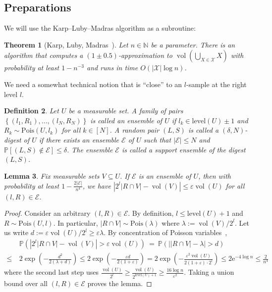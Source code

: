 \documentclass[11pt]{article}
\def\Natural{\mathbb{N}}
\let\N\Natural
\def\vol{\operatorname{vol}}		%
\def\set#1{\left\{ #1 \right\}}
\def\card#1{\left\lvert #1 \right\rvert}		%
\newtheorem{theorem}{Theorem}[section]
\newtheorem{lemma}[theorem]{Lemma}
\newtheorem{definition}[theorem]{Definition}
\newcommand{\Pois}{\mathrm{Pois}}
\newcommand{\level}{\mathrm{level}}
\newcommand{\eps}{\varepsilon}
\renewcommand{\Pr}{\mathbb{P}}
\newcommand{\class}[1]{\mathcal{#1}}
\begin{document}
\subsection{Preparations}
%
We will use the Karp--Luby--Madras algorithm as a subroutine:
%
\begin{theorem}[Karp, Luby, Madras~\cite{KarpLM89}]
    \label{thm:KLM}
    Let $n \in \N$ be a parameter. There is an algorithm \KLM{$\class{X}$} that computes a $(1\pm 0.5)$-approximation to $\vol(\bigcup_{X \in \class{X}} X)$ with probability at least $1 - n^{-3}$ and runs in time $O(|\class{X}| \log n)$.
\end{theorem}
%
\noindent
We need a somewhat technical notion that is ``close'' to an $l$-sample at the right level $l$.
\begin{definition}
    \label{def:digest}
    Let $U$ be a measurable set. A family of pairs $\set{(l_1,R_1), \dots, (l_N, R_N)}$ is called an \emph{ensemble} of $U$ if $l_k \in \level(U) \pm 1$ and $R_k \sim \Pois(U,l_k)$ for all $k \in [N]$.
    A random pair $(L,S)$ is called a \emph{$(\delta,N)$-digest} of $U$ if there exists an ensemble $\class{E}$ of $U$ such that $|\class{E}| \leq N$ and $\Pr[(L,S) \notin \class{E}] \leq \delta$. The ensemble $\class{E}$ is called a \emph{support ensemble} of the digest $(L,S)$.
\end{definition}
%
\begin{lemma}
    \label{lem:ensemble}
    Fix measurable sets $V \subseteq U$. If $\class{E}$ is an ensemble of $U$, then with probability at least $1 - \frac{2|\class{E}|}{n^4}$, we have $\left| 2^l \card{R \cap V} - \vol(V) \right| \leq \eps \vol(U)$ for all $(l,R) \in \class{E}$.
\end{lemma}
%
\begin{proof}
    Consider an arbitrary $(l,R) \in \class{E}$. By definition, $l \leq \level(U)+1$ and $R \sim \Pois(U,l)$. In particular, $|R \cap V| \sim \Pois(\lambda)$ where $\lambda := \vol(V)/2^l$. Let us write $d := \eps \vol(U) / 2^l \geq \eps \lambda$. By concentration of Poisson variables~\cite{Canonne19},
    \begin{align*}
        & \Pr\left( \left| 2^l \card{R \cap V} - \vol(V) \right| > \eps \vol(U) \right) \ 
        =\ \Pr( \left| \card{R \cap V} - \lambda \right| > d ) \\
        \leq\ & 2 \exp \left( -\frac{d^2}{2 (\lambda + d)} \right) 
        \leq 2 \exp \left( - \frac{\eps d}{2 (1 + \eps)} \right)
        = 2 \exp \left( - \frac{\eps^2 \vol(U)}{2(1 + \eps)\cdot 2^l} \right)
        \leq 2 \mathrm{e}^{-4 \log n}
        \le \frac{2}{n^4}
    \end{align*}
    where the second last step uses $\frac{\vol(U)}{2^l} \geq \frac{\vol(U)}{2^{\level(U)+1}} \geq \frac{16 \log n}{\eps^2}$. Taking a union bound over all $(l,R) \in \class{E}$ proves the lemma.
\end{proof}
\end{document}
